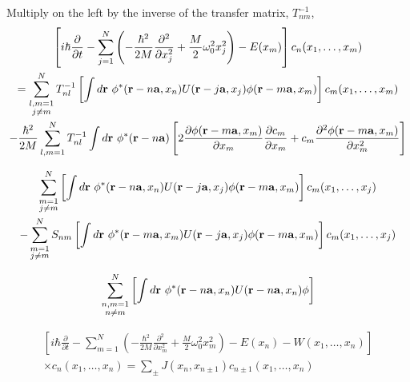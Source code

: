 Multiply on the left by the inverse of the transfer matrix, $T^{-1}_{nm}$,
\begin{equation}
    \begin{gathered}
        \left[ i\hbar \frac{\partial}{\partial t} - \sum_{j=1}^N \left(-\frac{\hbar^2}{2M}\frac{\partial^2}{\partial x_j^2} + \frac{M}{2}\omega_0^2 x_j^2 \right) -E(x_m) \right] c_n(x_1, \dots, x_m) \\
        = \sum_{\substack{l,m = 1 \\ j \neq m}}^N T^{-1}_{nl} \left[ \int  d\vb{r}\ \phi^*(\vb{r}-n\vb{a},x_n) U(\vb{r}-j\vb{a},x_j)\phi(\vb{r}-m\vb{a},x_m) \right] c_m(x_1,\dots,x_m) \\
        - \frac{\hbar^2}{2M} \sum_{l,m=1}^N T^{-1}_{nl} \int d\vb{r}\ \phi^*(\vb{r}-n\vb{a}) \left[ 2\frac{\partial\phi(\vb{r}-m\vb{a},x_m)}{\partial x_m}\frac{\partial c_m}{\partial x_m} + c_m \frac{\partial^2\phi(\vb{r}-m\vb{a},x_m)}{\partial x_m^2}\right]
    \end{gathered}
\end{equation}

\begin{equation}
\begin{gathered}
    \sum_{\substack{m = 1 \\ j \neq m}}^N \left[ \int d\vb{r}\ \phi^*(\vb{r}-n\vb{a}, x_n) U(\vb{r}-j\vb{a}, x_j) \phi(\vb{r}-m\vb{a}, x_m) \right] c_m(x_1, \dots, x_j) \\ 
    - \sum_{\substack{m = 1 \\ j \neq m}}^N S_{nm} \left[ \int d\vb{r}\ \phi^*(\vb{r}-m\vb{a}, x_m) U(\vb{r}-j\vb{a}, x_j) \phi(\vb{r}-m\vb{a}, x_m) \right] c_m(x_1, \dots, x_j)
\end{gathered}
\end{equation}

\begin{equation}
\begin{gathered}
    \sum_{\substack{n, m = 1 \\ n \neq m}}^N \left[ 
\int d\vb{r}\ \phi^*(\vb{r} - n\vb{a}, x_n) U(\vb{r} - n\vb{a}, x_n) \phi \right]
\end{gathered}
\end{equation}

\begin{equation}
\begin{gathered}
    \left[i\hbar \frac{\partial}{\partial t} - \sum_{m=1}^N\left(-\frac{\hbar^2}{2M} \frac{\partial^2}{\partial x_m^2} + \frac{M}{2} \omega_0^2 x_m^2\right) - E(x_n) - W(x_1, \dots, x_n)\right] \\
    \times c_n(x_1, \dots, x_n) = \sum_{\pm} J(x_n, x_{n \pm 1}) c_{n \pm 1}(x_1, \dots, x_n)
\end{gathered}
\end{equation}

